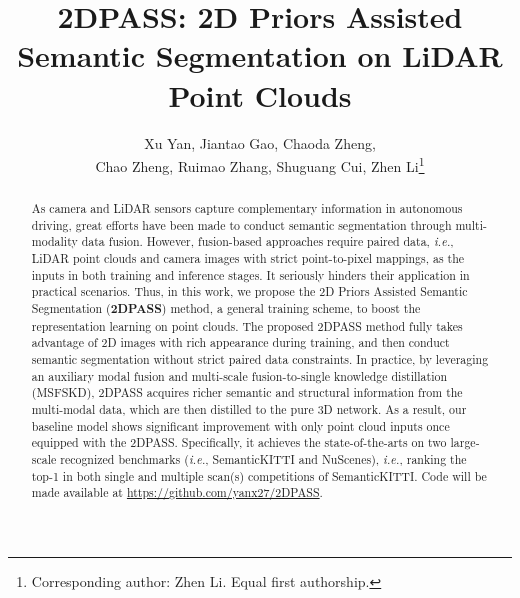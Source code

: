 \documentclass[runningheads]{llncs}
\begin{document}
	\pagestyle{headings}
	\mainmatter
	\def\ECCV16SubNumber{755}  

	\title{2DPASS: 2D Priors Assisted Semantic Segmentation on LiDAR Point Clouds} 

	
	
\author{Xu Yan, Jiantao Gao, Chaoda Zheng,  \\Chao Zheng, Ruimao Zhang, Shuguang Cui,  Zhen Li\thanks{{ Corresponding author: Zhen Li.  Equal first authorship.}} 
}
	
	\def\etal{\textit{et.al.}}
	\def\eg{{\textit{e.g.}}}
	\def\ie{{\textit{i.e.}}}
	
	\maketitle
	\begin{abstract}
		As camera and LiDAR sensors capture complementary information in autonomous driving, great efforts have been made to conduct semantic segmentation through multi-modality data fusion.
However, fusion-based approaches require paired data, \ie, LiDAR point clouds and camera images with strict point-to-pixel mappings, as the inputs in both training and inference stages.
It seriously hinders their application in practical scenarios.
Thus, in this work, we propose the {2D Priors Assisted Semantic Segmentation} ({\textbf{2DPASS}}) method, a general training scheme, to boost the representation learning on point clouds.
The proposed 2DPASS method fully takes advantage of 2D images with rich appearance during training, and then conduct semantic segmentation without strict paired data constraints.
In practice, by leveraging an auxiliary modal fusion and multi-scale fusion-to-single knowledge distillation (MSFSKD), 2DPASS acquires richer semantic and structural information from the multi-modal data, which are then distilled to the pure 3D network.
As a result, our baseline model shows significant improvement with only point cloud inputs once equipped with the 2DPASS. 
Specifically, it achieves the state-of-the-arts on two large-scale recognized benchmarks (\ie, SemanticKITTI and NuScenes), \ie, ranking the top-1 in both single and multiple scan(s) competitions of SemanticKITTI.
Code will be made available at \url{https://github.com/yanx27/2DPASS}.
		
		
	\end{abstract}
	
\end{document}
